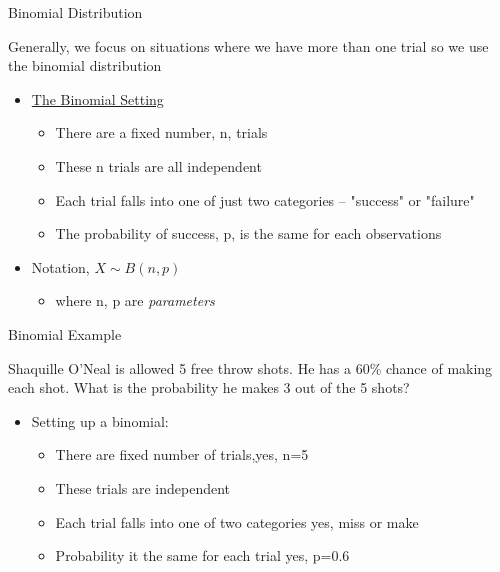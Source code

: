 \documentclass{beamer}
\begin{document}
\begin{frame}{Binomial Distribution}
	
	Generally, we focus on situations where we have more than one trial so we use the \alert{binomial distribution}
	\begin{itemize}
		\item \underline{The Binomial Setting}
		      \begin{itemize}
		      	\item There are a fixed number, n, trials 
		      	\item These n trials are all independent
		      	\item Each trial falls into one of just two categories -- "success" or "failure"
		      	\item The probability of success, p, is the same for each observations
		      \end{itemize}
		\item Notation, $X \sim B(n,p)$
		      \begin{itemize}
		      	\item where n, p are \textit{parameters}
		      \end{itemize}
	\end{itemize}
	
\end{frame}

\begin{frame}{Binomial Example}
	
	Shaquille O'Neal is allowed 5 free throw shots. He has a 60\% chance of making each shot. What is the probability he makes 3 out of the 5 shots?
	\begin{itemize}
		\item Setting up a binomial:
		      \begin{itemize} 
		      	\item There are fixed number of trials,\checkmark yes, n=5
		      	\item These trials are independent \checkmark 
		      	\item Each trial falls into one of two categories \checkmark yes, miss or make
		      	\item Probability it the same for each trial \checkmark yes, p=0.6
		      \end{itemize}
	\end{itemize}
	
\end{frame}
\end{document}
